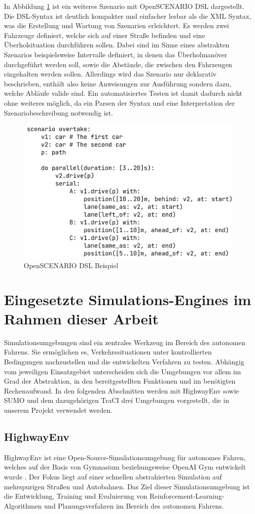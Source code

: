 In Abbildung \ref{fig:osl-dsl} ist ein weiteres Szenario mit OpenSCENARIO DSL dargestellt.
Die DSL-Syntax ist deutlich kompakter und einfacher lesbar als die XML Syntax, was die Erstellung und Wartung von Szenarien erleichtert.
Es werden zwei Fahrzeuge definiert, welche sich auf einer Straße befinden und eine Überholsituation durchführen sollen.
Dabei sind im Sinne eines abstrakten Szenarios beispielsweise Intervalle definiert, in denen das Überholmanöver durchgeführt werden soll, sowie die Abstände, die zwischen den Fahrzeugen eingehalten werden sollen.
Allerdings wird das Szenario nur deklarativ beschrieben, enthält also keine Anweisungen zur Ausführung sondern dazu, welche Abläufe valide sind.
Ein automatisiertes Testen ist damit dadurch nicht ohne weiteres möglich, da ein Parsen der Syntax und eine Interpretation der Szenariobeschreibung notwendig ist. 

\begin{figure}[h]
    \centering
    \includegraphics[width=0.6\linewidth]{contents/figures/openscenario_dsl.png}
    \caption{OpenSCENARIO DSL Beispiel \cite{EinfuehrungIntegrationsprojekt}}
    \label{fig:osl-dsl}
\end{figure}

\section{Eingesetzte Simulations-Engines im Rahmen dieser Arbeit}
Simulationsumgebungen sind ein zentrales Werkzeug im Bereich des autonomen Fahrens. Sie ermöglichen es, Verkehrssituationen unter kontrollierten Bedingungen nachzustellen und die entwickelten Verfahren zu testen. Abhängig vom jeweiligen Einsatzgebiet unterscheiden sich die Umgebungen vor allem im Grad der Abstraktion, in den bereitgestellten Funktionen und im benötigten Rechenaufwand. In den folgenden Abschnitten werden mit HighwayEnv sowie SUMO und dem dazugehörigen TraCI drei Umgebungen vorgestellt, die in unserem Projekt verwendet werden.
\subsection{HighwayEnv}
HighwayEnv ist eine Open-Source-Simulationsumgebung für autonomes Fahren, welches auf der Basis von Gymnasium beziehungsweise OpenAI Gym entwickelt wurde \cite{highway-env}. Der Fokus liegt auf einer schnellen abstrahierten Simulation auf mehrspurigen Straßen und Autobahnen. Das Ziel dieser Simulationsumgebung ist die Entwicklung, Training und Evaluierung von Reinforcement-Learning-Algorithmen und Planungsverfahren im Bereich des autonomen Fahrens.

